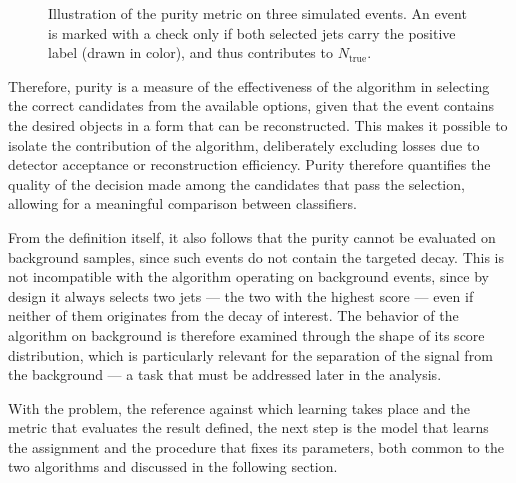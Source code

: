 \begin{figure}[t]
\caption{Illustration of the purity metric on three simulated events. An event is marked with a check only if both selected jets carry the positive label (drawn in color), and thus contributes to $N_{\mathrm{true}}$.}
\label{fig:purity}
\end{figure}


Therefore, purity is a measure of the effectiveness of the algorithm in selecting the correct candidates from the available options, given that the event contains the desired objects in a form that can be reconstructed. This makes it possible to isolate the contribution of the algorithm, deliberately excluding losses due to detector acceptance or reconstruction efficiency. Purity therefore quantifies the quality of the decision made among the candidates that pass the selection, allowing for a meaningful comparison between classifiers.

From the definition itself, it also follows that the purity cannot be evaluated on background samples, since such events do not contain the targeted decay. This is not incompatible with the algorithm operating on background events, since by design it always selects two jets — the two with the highest score — even if neither of them originates from the decay of interest. The behavior of the algorithm on background is therefore examined through the shape of its score distribution, which is particularly relevant for the separation of the signal from the background — a task that must be addressed later in the analysis.\bigskip


\noindent With the problem, the reference against which learning takes place and the metric that evaluates the result defined, the next step is the model that learns the assignment and the procedure that fixes its parameters, both common to the two algorithms and discussed in the following section.

